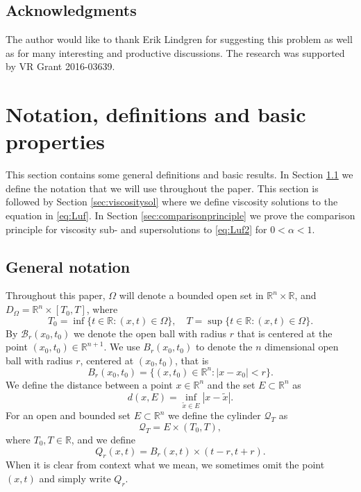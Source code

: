 \documentclass[11pt]{article}
\newcommand{\R}{\mathbb{R}}
\providecommand{\Rn}{\mathbb{R}^n}
\providecommand{\Rnp}{D_{\Omega}}
\providecommand{\cyl}{\mathcal{Q}_{T}}
\numberwithin{equation}{section}
\theoremstyle{definition}
\begin{document}
\subsection*{Acknowledgments}
The author would like to thank Erik Lindgren for suggesting this problem as well as for many interesting and productive discussions. The research was supported by VR Grant 2016-03639.

\section{Notation, definitions and basic properties}
This section contains some general definitions and basic results. In Section \ref{subsec:generalnotation} we define the notation that we will use throughout the paper. This section is followed by Section \ref{sec:viscositysol} where we define viscosity solutions to the equation in \eqref{eq:Luf}. In Section \ref{sec:comparisonprinciple} we prove the comparison principle for viscosity sub- and supersolutions to \eqref{eq:Luf2} for $0 <\alpha<1$.

\subsection{General notation}\label{subsec:generalnotation}
Throughout this paper, $\Omega$ will denote a bounded open set in $\Rn \times \R$, and $\Rnp=\Rn \times [T_0,T]$, where
\begin{equation*}
    T_0 = \inf\{t \in \R: (x,t) \in \Omega\}, \quad T = \sup\{t \in \R: (x,t) \in \Omega\}.
\end{equation*}
By $\mathcal{B}_r(x_0,t_0)$ we denote the open ball with radius $r$ that is centered at the point $(x_0,t_0) \in \mathbb{R}^{n+1}$. We use $B_r(x_0,t_0)$ to denote the $n$ dimensional open ball with radius $r$, centered at $(x_0,t_0)$, that is 
$$
B_r(x_0,t_0) = \{(x,t_0) \in \Rn: |x-x_0|<r \}.
$$
We define the distance between a point $x \in \Rn$ and the set $E \subset \Rn$ as
\begin{equation*}
    d(x, E) = \inf_{\tilde{x} \in E} |x-\tilde{x}|.
\end{equation*}
For an open and bounded set $E \subset \Rn$ we define the cylinder $\cyl$ as
\begin{equation}\label{eq:cyl}
    \cyl = E \times (T_0,T),
\end{equation}
where $T_0,T \in \R$, and we define 
\begin{equation}\label{eq:Nr}
   Q_r(x,t)=B_r(x,t) \times (t-r,t+r).
\end{equation}
When it is clear from context what we mean, we sometimes omit the point $(x,t)$ and simply write $Q_r$. 
\end{document}
